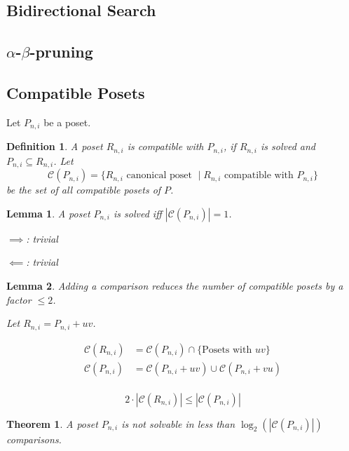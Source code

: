 \documentclass[10pt,journal,compsoc]{IEEEtran}
\newtheorem{theorem}{Theorem}
\newtheorem{lemma}{Lemma}
\newtheorem{definition}{Definition}
\begin{document}
\subsection{Bidirectional Search}

\subsection{$\alpha$-$\beta$-pruning}

\subsection{Compatible Posets}

Let $P_{n,i}$ be a poset.
\begin{definition}
  A poset $R_{n,i}$ is compatible with $P_{n,i}$, if $R_{n,i}$ is solved and $P_{n,i} \subseteq R_{n,i}$.
  Let $$\mathcal{C}(P_{n,i}) = \{ R_{n,i} \text{ canonical poset } \mid R_{n,i} \text{ compatible with } P_{n,i} \}$$ be the set of all compatible posets of $P$.
\end{definition}

\begin{lemma}
  A poset $P_{n,i}$ is solved iff $|\mathcal{C}(P_{n,i})| = 1$.

  $\implies$: trivial

  $\impliedby$: trivial
\end{lemma}

\begin{lemma}
  Adding a comparison reduces the number of compatible posets by a factor $\leq 2$.

  Let $R_{n,i} = P_{n,i} + uv$.

  \begin{align*}
    \mathcal{C}(R_{n,i}) & = \mathcal{C}(P_{n,i}) \cap \{ \text{Posets with } uv \}   \\
    \mathcal{C}(P_{n,i}) & = \mathcal{C}(P_{n,i} + uv) \cup \mathcal{C}(P_{n,i} + vu) \\
  \end{align*}

  $$2 \cdot |\mathcal{C}(R_{n,i})| \leq |\mathcal{C}(P_{n,i})|$$
\end{lemma}

\begin{theorem}
  A poset $P_{n,i}$ is not solvable in less than $\log_2(|\mathcal{C}(P_{n,i})|)$ comparisons.


\end{theorem}
\end{document}
